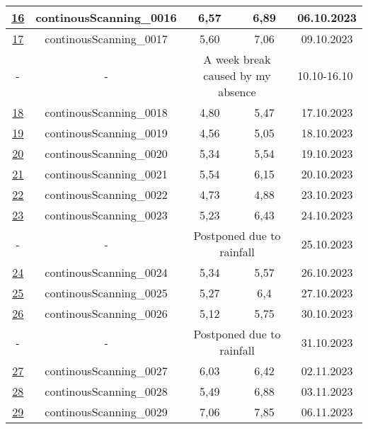 \begin{table}[htbp]
{\begin{tabular}{|c|c|c|c|c|}
    \midrule
    \hyperref[fig:fig16]{16}    & continousScanning\_0016 & 6,57  & 6,89  & 06.10.2023 \\
    \midrule
    \hyperref[fig:fig17]{17}    & continousScanning\_0017 & 5,60  & 7,06  & 09.10.2023 \\
    \midrule
    -     & -     & \multicolumn{2}{c|}{A week break caused by my absence} & \multicolumn{1}{l|}{10.10-16.10} \\
    \midrule
    \hyperref[fig:fig18]{18}    & continousScanning\_0018 & 4,80  & 5,47  & 17.10.2023 \\
    \midrule
    \hyperref[fig:fig19]{19}    & continousScanning\_0019 & 4,56  & 5,05  & 18.10.2023 \\
    \midrule
    \hyperref[fig:fig20]{20}    & continousScanning\_0020 & 5,34  & 5,54  & 19.10.2023 \\
    \midrule
    \hyperref[fig:fig21]{21}    & continousScanning\_0021 & 5,54  & 6,15  & 20.10.2023 \\
    \midrule
    \hyperref[fig:fig22]{22}    & continousScanning\_0022 & 4,73  & 4,88  & 23.10.2023 \\
    \midrule
    \hyperref[fig:fig23]{23}    & continousScanning\_0023 & 5,23  & 6,43  & 24.10.2023 \\
    \midrule
    -     & -     & \multicolumn{2}{c|}{Postponed due to rainfall} & 25.10.2023 \\
    \midrule
    \hyperref[fig:fig24]{24}    & continousScanning\_0024 & 5,34  & 5,57  & 26.10.2023 \\
    \midrule
    \hyperref[fig:fig25]{25}    & continousScanning\_0025 & 5,27  & 6,4   & 27.10.2023 \\
    \midrule
    \hyperref[fig:fig26]{26}    & continousScanning\_0026 & 5,12  & 5,75  & 30.10.2023 \\
    \midrule
    -     & -     & \multicolumn{2}{c|}{Postponed due to rainfall} & 31.10.2023 \\
    \midrule
    \hyperref[fig:fig27]{27}    & continousScanning\_0027 & 6,03  & 6,42  & 02.11.2023 \\
    \midrule
    \hyperref[fig:fig28]{28}    & continousScanning\_0028 & 5,49  & 6,88  & 03.11.2023 \\
    \midrule
    \hyperref[fig:fig29]{29}    & continousScanning\_0029 & 7,06  & 7,85  & 06.11.2023 \\
    \bottomrule
    \end{tabular}}%
  \label{tab:addlabel}%
\end{table}%
